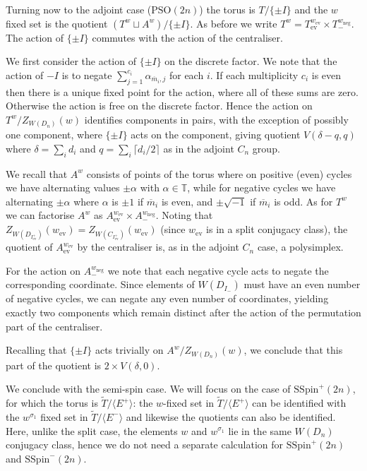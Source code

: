 \documentclass[11pt,a4paper]{article}
\def\SSpin{\mathrm{SSpin}}
\def\PSO{\mathrm{PSO}}
\def\SSpin{\mathrm{SSpin}}
\def\TT{\mathbb{T}}
\def\mbar{\overline{m}}
\def\mbar{\overline{m}}
\def\coveringtorus{\tilde{T}}
\def\ev{\mathrm{ev}}
\def\neg{\mathrm{neg}}
\begin{document}
\bigskip

Turning now to the adjoint case ($\PSO(2n)$) the torus is $T/\{\pm I\}$ and the $w$ fixed set is the quotient $(T^w \sqcup A^w)/\{\pm I\}$. As before we write $T^w=T_{\ev}^{w_\ev}\times T_-^{w_\neg}$. The action of $\{\pm I\}$ commutes with the action of the centraliser.

We first consider the action of $\{\pm I \}$ on the discrete factor. We note that the action of $-I$ is to negate $\sum_{j=1}^{c_i}\alpha_{\mbar_i,j}$ for each $i$. If each multiplicity $c_i$ is even then there is a unique fixed point for the action, where all of these sums are zero. Otherwise the action is free on the discrete factor. Hence the action on $T^w/Z_{W(D_n)}(w)$ identifies components in pairs, with the exception of possibly one component, where $\{\pm I \}$ acts on the component, giving quotient $V(\delta-q,q)$ where $\delta=\sum_i d_i$ and $q=\sum_i\lceil d_i/2\rceil$ as in the adjoint $C_n$ group.


We recall that $A^w$ consists of points of the torus where on positive (even) cycles we have alternating values $\pm\alpha$ with $\alpha\in \TT$, while for negative cycles we have alternating $\pm\alpha$ where $\alpha$ is $\pm 1$ if $\mbar_i$ is even, and $\pm \sqrt{-1}$ if $\mbar_i$ is odd. As for $T^w$ we can factorise $A^w$ as $A_{\ev}^{w_\ev}\times A_-^{w_\neg}$. Noting that $Z_{W(D_{I_{\ev}^+})}(w_\ev)=Z_{W(C_{I_{\ev}^+})}(w_\ev)$ (since $w_\ev$ is in a split conjugacy class), the quotient of $A_{\ev}^{w_\ev}$ by the centraliser is, as in the adjoint $C_n$ case, a polysimplex.

For the action on $A_-^{w_\neg}$ we note that each negative cycle acts to negate the corresponding coordinate.  Since elements of $W(D_{I_-})$ must have an even number of negative cycles, we can negate any even number of coordinates, yielding exactly two components which remain distinct after the action of the permutation part of the centraliser.

Recalling that $\{\pm I\}$ acts trivially on $A^w/Z_{W(D_n)}(w)$, we conclude that this part of the quotient is $2\times V(\delta,0)$.











\bigskip


We conclude with the semi-spin case. We will focus on the case of $\SSpin^+(2n)$, for which the torus is $\coveringtorus/\langle E^+\rangle$: the $w$-fixed set in $\coveringtorus/\langle E^+\rangle$ can be identified with the $w^{\sigma_1}$ fixed set in $\coveringtorus/\langle E^-\rangle$ and likewise the quotients can also be identified. Here, unlike the split case, the elements $w$ and $w^{\sigma_1}$ lie in the same $W(D_n)$ conjugacy class, hence we do not need a separate calculation for $\SSpin^+(2n)$ and $\SSpin^-(2n)$.
\end{document}
